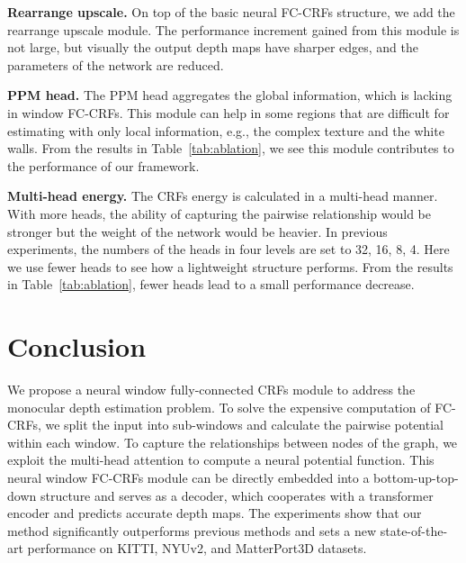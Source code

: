 \documentclass[10pt,twocolumn,letterpaper]{article}
\begin{document}
\textbf{Rearrange upscale. } On top of the basic neural FC-CRFs structure, we add the rearrange upscale module. The performance increment gained from this module is not large, but visually the output depth maps have sharper edges, and the parameters of the network are reduced.

\textbf{PPM head. } The PPM head aggregates the global information, which is lacking in window FC-CRFs. This module can help in some regions that are difficult for estimating with only local information, e.g., the complex texture and the white walls. From the results in Table~\ref{tab:ablation}, we see this module contributes to the performance of our framework. 





\textbf{Multi-head energy. } 
The CRFs energy is calculated in a multi-head manner. With more heads, the ability of capturing the pairwise relationship would be stronger but the weight of the network would be heavier. In previous experiments, the numbers of the heads in four levels are set to 32, 16, 8, 4. Here we use fewer heads to see how a lightweight structure performs. From the results in Table~\ref{tab:ablation}, fewer heads lead to a small performance decrease.


 
\section{Conclusion}

We propose a neural window fully-connected CRFs module to address the monocular depth estimation problem. To solve the expensive computation of FC-CRFs, we split the input into sub-windows and calculate the pairwise potential within each window. To capture the relationships between nodes of the graph, we exploit the multi-head attention to compute a neural potential function. 
This neural window FC-CRFs module can be directly embedded into a bottom-up-top-down structure and serves as a decoder, which cooperates with a transformer encoder and predicts accurate depth maps.
The experiments show that our method significantly outperforms previous methods and sets a new state-of-the-art performance on KITTI, NYUv2, and MatterPort3D datasets. 
{\small


}
\end{document}
